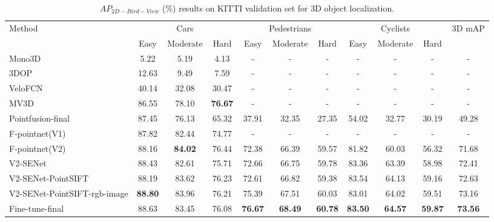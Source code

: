\documentclass[letterpaper]{article} %
\begin{document}
\begin{table}[h]
\scriptsize
\centering
\begin{tabular}{l|c|c|c|c|c|c|c|c|c|c}
\hline
\multirow{2}{*}{Method} & \multicolumn{3}{c|}{Cars} &
\multicolumn{3}{c|}{Pedestrians} & \multicolumn{3}{c|}{Cyclists} & \multicolumn{1}{c}{\multirow{2}{*}{3D mAP}} \\
\cline{2-10}

& Easy & Moderate & Hard & Easy & Moderate & Hard & Easy & Moderate & Hard & \multicolumn{1}{c}{} \\
\hline
\hline
Mono3D~\cite{chen2016monocular} &5.22 &5.19 &4.13 &- &- &- &- &- &- &-  \\
3DOP~\cite{chen20153d}   &12.63 &9.49 &7.59 &- &- &- &- &- &- &-  \\
VeloFCN~\cite{li20173d}		            & 40.14 & 32.08 & 30.47 & - & - & - & -  & - & - & - \\
MV3D~\cite{chen2017multi} 	                    & 86.55 & 78.10 & \textbf{76.67} & - & - & - & -  & - & - & - \\
Pointfusion-final~\cite{xu2017pointfusion} 			& 87.45 & 76.13 & 65.32 & 37.91 & 32.35 & 27.35 & 54.02  & 32.77 & 30.19 & 49.28\\
F-pointnet(V1)~\cite{qi2017frustum}			    & 87.82 & 82.44 & 74.77 & - & - & - & -  & - & - & -\\
F-pointnet(V2)~\cite{qi2017frustum} 			    & 88.16 & \textbf{84.02} & 76.44 & 72.38 & 66.39 & 59.57 & 81.82  & 60.03 & 56.32 & 71.68\\
\hline
V2-SENet			        & 88.43 & 82.61 & 75.71 & 72.66 & 66.75 & 59.78 & 83.36  & 63.39 & 58.98 & 72.41\\
V2-SENet-PointSIFT			& 88.19 & 83.62 & 76.23 & 72.61 & 66.82 & 59.38 & 83.54  & 64.13 & 59.16 & 72.63\\
V2-SENet-PointSIFT-rgb-image &\textbf{88.80} &83.96 &76.21 &75.39 &67.51 &60.03 &83.01 &64.02 &59.51 &73.16 \\
Fine-tune-final	& 88.63 & 83.45 & 76.08 & \textbf{76.67} & \textbf{68.49}
                & \textbf{60.78} & \textbf{83.50}  & \textbf{64.57} & \textbf{59.87} & \textbf{73.56}\\
\hline

\end{tabular}
\caption{$AP_{2D-Bird-View}$ (\%) results on KITTI validation set for 3D object localization.}
\label{T2}
\end{table}
\end{document}

